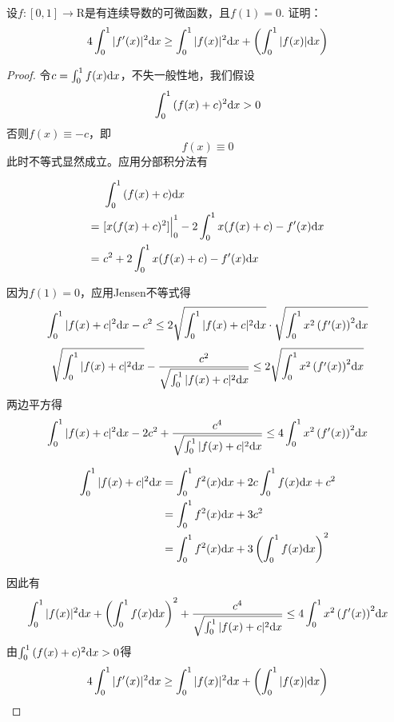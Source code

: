 \begin{proposition}

    设$f:[0, 1] \to \mathrm{R}$是有连续导数的可微函数，且$f(1) = 0$. 证明：
    \[4\int_{0}^{1}{|f'(x)|^2}\mathrm{d} x \geq \int_{0}^{1}{|f(x)|^2}\mathrm{d} x + \left( \int_{0}^{1}{|f(x)|}\mathrm{d} x \right)\]

\end{proposition}

\begin{proof}
    
    令$c = \int_{0}^{1}{f(x)}\mathrm{d} x$，不失一般性地，我们假设
    \[\int_{0}^{1}{(f(x) + c)^2}\mathrm{d} x > 0\]
    否则$f(x) \equiv -c $，即
    \[f(x) \equiv 0\]
    此时不等式显然成立。应用分部积分法有

    \begin{align*}
        & \int_{0}^{1}{(f(x) + c)}\mathrm{d} x \\
        = \  & [x(f(x) + c)^2] \Big|_{0}^{1} - 2\int_{0}^{1}{x(f(x) + c) - f'(x)}\mathrm{d} x \\
        = \ & c^2 + 2\int_{0}^{1}{x(f(x) + c) - f'(x)}\mathrm{d} x
    \end{align*}

    因为$f(1) = 0$，应用\textup{Jensen}不等式得
    \[ \int_{0}^{1}{|f(x) + c|^2}\mathrm{d} x - c^2 \leq 2\sqrt{\int_{0}^{1}{|f(x) + c|^2}\mathrm{d} x} \cdot \sqrt{\int_{0}^{1}{x^2 \left( f'(x) \right)^2}\mathrm{d} x} \]
    \[ \sqrt{\int_{0}^{1}{|f(x) + c|^2}\mathrm{d} x} - \dfrac{c^2}{\sqrt{\int_{0}^{1}{|f(x) + c|^2}\mathrm{d} x}} \leq 2\sqrt{\int_{0}^{1}{x^2 \left( f'(x) \right)^2}\mathrm{d} x} \]
    两边平方得
    \[\int_{0}^{1}{|f(x) + c|^2}\mathrm{d} x -2c^2 + \dfrac{c^4}{\sqrt{\int_{0}^{1}{|f(x) + c|^2}\mathrm{d} x}} \leq 4 \int_{0}^{1}{x^2 \left( f'(x) \right)^2}\mathrm{d} x \]

    \begin{align*}
        \int_{0}^{1}{|f(x) + c|^2}\mathrm{d} x & = \int_{0}^{1}{f^2(x)}\mathrm{d} x + 2c \int_{0}^{1}{f(x)}\mathrm{d} x + c^2 \\
        & = \int_{0}^{1}{f^2(x)}\mathrm{d} x + 3c^2 \\
        & = \int_{0}^{1}{f^2(x)}\mathrm{d} x + 3\left( \int_{0}^{1}{f(x)}\mathrm{d} x \right)^2
    \end{align*}

    因此有
    \[\int_{0}^{1}{|f(x)|^2}\mathrm{d} x + \left( \int_{0}^{1}{f(x)}\mathrm{d} x \right)^2 + \dfrac{c^4}{\sqrt{\int_{0}^{1}{|f(x) + c|^2}\mathrm{d} x}} \leq 4 \int_{0}^{1}{x^2 \left( f'(x) \right)^2}\mathrm{d} x \]
    由$\int_{0}^{1}{(f(x) + c)^2}\mathrm{d} x > 0$得
    \[4\int_{0}^{1}{|f'(x)|^2}\mathrm{d} x \geq \int_{0}^{1}{|f(x)|^2}\mathrm{d} x + \left( \int_{0}^{1}{|f(x)|}\mathrm{d} x \right)\]

\end{proof}


